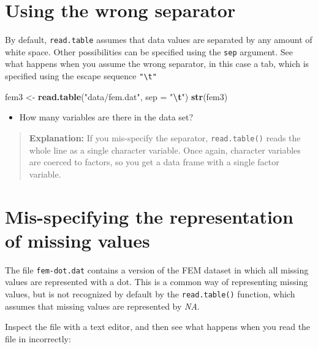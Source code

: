 \documentclass[
]{book}
\newenvironment{Shaded}{\begin{snugshade}}{\end{snugshade}}
\newcommand{\AttributeTok}[1]{\textcolor[rgb]{0.13,0.29,0.53}{#1}}
\newcommand{\FunctionTok}[1]{\textcolor[rgb]{0.13,0.29,0.53}{\textbf{#1}}}
\newcommand{\NormalTok}[1]{#1}
\newcommand{\OtherTok}[1]{\textcolor[rgb]{0.56,0.35,0.01}{#1}}
\newcommand{\SpecialCharTok}[1]{\textcolor[rgb]{0.81,0.36,0.00}{\textbf{#1}}}
\newcommand{\StringTok}[1]{\textcolor[rgb]{0.31,0.60,0.02}{#1}}
\providecommand{\tightlist}{%
  \setlength{\itemsep}{0pt}\setlength{\parskip}{0pt}}
\begin{document}
\section{Using the wrong separator}\label{using-the-wrong-separator}

By default, \texttt{read.table} assumes that data values are separated
by any amount of white space. Other possibilities can be specified
using the \texttt{sep} argument. See what happens when you assume the
wrong separator, in this case a tab, which is specified using the
escape sequence \texttt{"\textbackslash{}t"}

\begin{Shaded}
\begin{Highlighting}[]
\NormalTok{fem3 }\OtherTok{\textless{}{-}} \FunctionTok{read.table}\NormalTok{(}\StringTok{"data/fem.dat"}\NormalTok{, }\AttributeTok{sep =} \StringTok{"}\SpecialCharTok{\textbackslash{}t}\StringTok{"}\NormalTok{)}
\FunctionTok{str}\NormalTok{(fem3)}
\end{Highlighting}
\end{Shaded}

\begin{itemize}
\tightlist
\item
  How many variables are there in the data set?
\end{itemize}

\begin{quote}
\textbf{Explanation:} If you mis-specify the separator,
\texttt{read.table()} reads the whole line as a single character
variable. Once again, character variables are coerced to factors, so
you get a data frame with a single factor variable.
\end{quote}

\section{Mis-specifying the representation of missing values}\label{mis-specifying-the-representation-of-missing-values}

The file \texttt{fem-dot.dat} contains a version of the FEM dataset in
which all missing values are represented with a dot. This is a common
way of representing missing values, but is not recognized by default
by the \texttt{read.table()} function, which assumes that missing values
are represented by \emph{NA}.

Inspect the file with a text editor, and then see what happens when
you read the file in incorrectly:
\end{document}
